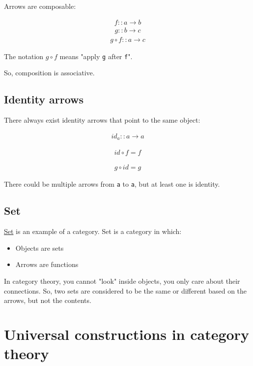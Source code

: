 \documentclass[11pt]{article}
\begin{document}
Arrows are composable:

\begin{eqnarray}
f :: a \rightarrow b
\end{eqnarray}
\begin{eqnarray}
g :: b \rightarrow c
\end{eqnarray}
\begin{eqnarray}
g \circ f :: a \rightarrow c
\end{eqnarray}

The notation \(g \circ f\) means "apply \texttt{g} after \texttt{f}".

So, composition is associative.

\subsection{Identity arrows}
\label{sec:orge61eaac}

There always exist identity arrows that point to the same object:

\begin{eqnarray}
id_a :: a \rightarrow a
\end{eqnarray}

\begin{eqnarray}
id \circ f = f
\end{eqnarray}

\begin{eqnarray}
g \circ id = g
\end{eqnarray}

There could be multiple arrows from \texttt{a} to \texttt{a}, but at least one is identity.

\subsection{Set}
\label{sec:org8b284b5}

\href{https://en.wikipedia.org/wiki/Set\_theory}{Set} is an example of a category. Set is a category in which:
\begin{itemize}
\item Objects are sets
\item Arrows are functions
\end{itemize}

In category theory, you cannot "look" inside objects, you only care about their connections. So, two sets are considered to be the same or different based on the arrows, but not the contents.

\section{Universal constructions in category theory}
\label{sec:orgfb8900b}
\end{document}
